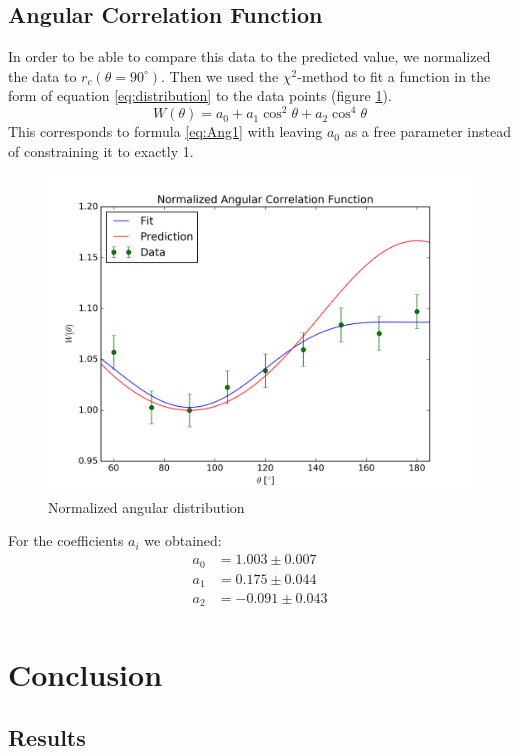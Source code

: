 \documentclass[a4paper,parskip,11pt, DIV12]{scrreprt}
\begin{document}
\section{Angular Correlation Function} \label{sec:DataAnalysis}

In order to be able to compare this data to the predicted value, we normalized the data to $r_{c}(\theta=90^{\circ})$. Then we used the $\chi^2$-method to fit a function in the form of equation \ref{eq:distribution} to the data points (figure \ref{fig:distribution}).
\begin{equation} \label{eq:distribution}
W(\theta) = a_0 + a_1 \cos^2 \theta + a_2 \cos^4 \theta
\end{equation}
This corresponds to formula \ref{eq:Ang1} with leaving $a_0$ as a free parameter instead of constraining it to exactly 1.
%
\begin{figure}[H]
\centering
\includegraphics[scale=0.65]{dist.png}
\caption[Distribution]{Normalized angular distribution}
\label{fig:distribution}
\end{figure}
%
For the coefficients $a_i$ we obtained:
%
\begin{align*}
a_0 &= 1.003 \pm 0.007\\
a_1 &= 0.175 \pm 0.044\\
a_2 &= -0.091 \pm 0.043\\
\end{align*}
%

\chapter{Conclusion}
\section{Results}
\end{document}

